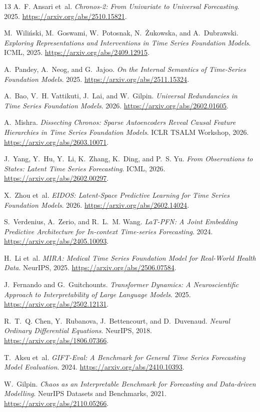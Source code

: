 \documentclass[10pt,a4paper,twocolumn]{article}
\begin{document}
\begin{thebibliography}{13}
A.~F. Ansari et~al. \emph{Chronos-2: From Univariate to Universal Forecasting}. 2025.
\url{https://arxiv.org/abs/2510.15821}.

M.~Wili\'nski, M.~Goswami, W.~Potosnak, N.~\.Zukowska, and A.~Dubrawski.
\emph{Exploring Representations and Interventions in Time Series Foundation Models}. ICML, 2025.
\url{https://arxiv.org/abs/2409.12915}.

A.~Pandey, A.~Neog, and G.~Jajoo.
\emph{On the Internal Semantics of Time-Series Foundation Models}. 2025.
\url{https://arxiv.org/abs/2511.15324}.

A.~Bao, V.~H. Vattikuti, J.~Lai, and W.~Gilpin.
\emph{Universal Redundancies in Time Series Foundation Models}. 2026.
\url{https://arxiv.org/abs/2602.01605}.

A.~Mishra. \emph{Dissecting Chronos: Sparse Autoencoders Reveal Causal Feature Hierarchies in Time Series Foundation Models}. ICLR TSALM Workshop, 2026.
\url{https://arxiv.org/abs/2603.10071}.

J.~Yang, Y.~Hu, Y.~Li, K.~Zhang, K.~Ding, and P.~S. Yu.
\emph{From Observations to States: Latent Time Series Forecasting}. ICML, 2026.
\url{https://arxiv.org/abs/2602.00297}.

X.~Zhou et~al. \emph{EIDOS: Latent-Space Predictive Learning for Time Series Foundation Models}. 2026.
\url{https://arxiv.org/abs/2602.14024}.

S.~Verdenius, A.~Zerio, and R.~L.~M. Wang.
\emph{LaT-PFN: A Joint Embedding Predictive Architecture for In-context Time-series Forecasting}. 2024.
\url{https://arxiv.org/abs/2405.10093}.

H.~Li et~al. \emph{MIRA: Medical Time Series Foundation Model for Real-World Health Data}. NeurIPS, 2025.
\url{https://arxiv.org/abs/2506.07584}.

J.~Fernando and G.~Guitchounts.
\emph{Transformer Dynamics: A Neuroscientific Approach to Interpretability of Large Language Models}. 2025.
\url{https://arxiv.org/abs/2502.12131}.

R.~T.~Q. Chen, Y.~Rubanova, J.~Bettencourt, and D.~Duvenaud.
\emph{Neural Ordinary Differential Equations}. NeurIPS, 2018.
\url{https://arxiv.org/abs/1806.07366}.

T.~Aksu et~al. \emph{GIFT-Eval: A Benchmark for General Time Series Forecasting Model Evaluation}. 2024.
\url{https://arxiv.org/abs/2410.10393}.

W.~Gilpin. \emph{Chaos as an Interpretable Benchmark for Forecasting and Data-driven Modelling}. NeurIPS Datasets and Benchmarks, 2021.
\url{https://arxiv.org/abs/2110.05266}.
\end{thebibliography}
\end{document}
